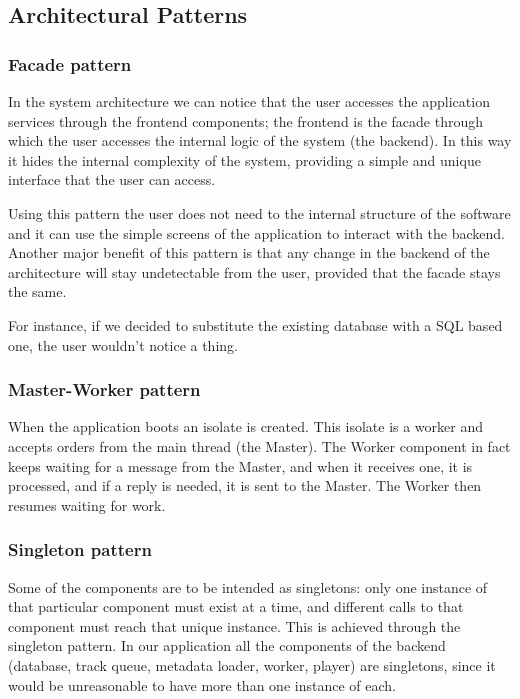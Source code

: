 \documentclass{article}
\begin{document}
\subsection{Architectural Patterns}

\subsubsection{Facade pattern}
In the system architecture we can notice that the user accesses the application
services through the frontend components; the frontend is the facade through
which the user accesses the internal logic of the system (the backend). In this
way it hides the internal complexity of the system, providing a simple and
unique interface that the user can access.

Using this pattern the user does not need to the internal structure of the
software and it can use the simple screens of the application to interact with
the backend. Another major benefit of this pattern is that any change in the
backend of the architecture will stay undetectable from the user, provided that
the facade stays the same.

For instance, if we decided to substitute the existing database with a SQL based
one, the user wouldn't notice a thing.

\subsubsection{Master-Worker pattern}
When the application boots an isolate is created. This isolate is a worker and
accepts orders from the main thread (the Master). The Worker component in fact
keeps waiting for a message from the Master, and when it receives one, it is
processed, and if a reply is needed, it is sent to the Master. The Worker then
resumes waiting for work.

\subsubsection{Singleton pattern}
Some of the components are to be intended as singletons: only one instance of
that particular component must exist at a time, and different calls to that
component must reach that unique instance. This is achieved through the
singleton pattern. In our application all the components of the backend
(database, track queue, metadata loader, worker, player) are singletons, since
it would be unreasonable to have more than one instance of each.
\end{document}
